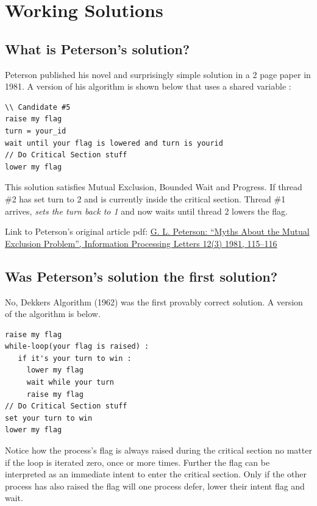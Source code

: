 \section{Working Solutions}\label{working-solutions}

\subsection{What is Peterson's solution?}\label{what-is-petersons-solution}

Peterson published his novel and surprisingly simple solution in a 2 page paper in 1981. A version of his algorithm is shown below that uses a shared variable :

\begin{lstlisting}
\\ Candidate #5
raise my flag
turn = your_id
wait until your flag is lowered and turn is yourid
// Do Critical Section stuff
lower my flag
\end{lstlisting}

This solution satisfies Mutual Exclusion, Bounded Wait and Progress. If thread \#2 has set turn to 2 and is currently inside the critical section. Thread \#1 arrives, \emph{sets the turn back to 1} and now waits until thread 2 lowers the flag.

Link to Peterson's original article pdf: \href{http://dl.acm.org/citation.cfm?id=945527}{G. L. Peterson: ``Myths About the Mutual Exclusion Problem'', Information Processing Letters 12(3) 1981, 115--116}

\subsection{Was Peterson's solution the first solution?}\label{was-petersons-solution-the-first-solution}

No, Dekkers Algorithm (1962) was the first provably correct solution. A version of the algorithm is below.

\begin{lstlisting}
raise my flag
while-loop(your flag is raised) :
   if it's your turn to win :
     lower my flag
     wait while your turn
     raise my flag
// Do Critical Section stuff
set your turn to win
lower my flag
\end{lstlisting}

Notice how the process's flag is always raised during the critical section no matter if the loop is iterated zero, once or more times. Further the flag can be interpreted as an immediate intent to enter the critical section. Only if the other process has also raised the flag will one process defer, lower their intent flag and wait.

